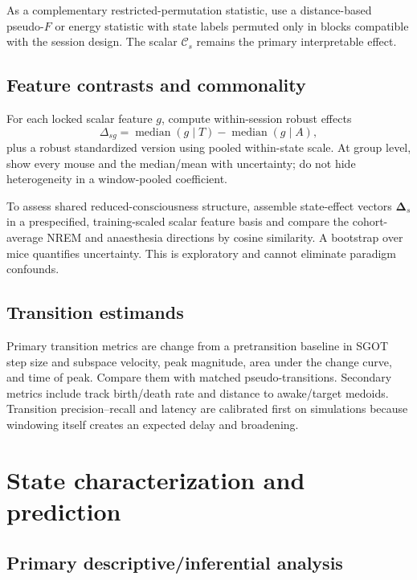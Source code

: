 \documentclass[11pt,a4paper]{article}
\begin{document}
As a complementary restricted-permutation statistic, use a distance-based pseudo-$F$ or energy statistic with state labels permuted only in blocks compatible with the session design. The scalar $\mathcal C_s$ remains the primary interpretable effect.

\subsection{Feature contrasts and commonality}

For each locked scalar feature $g$, compute within-session robust effects
\begin{equation}
  \Delta_{sg}=\operatorname{median}(g\mid T)-\operatorname{median}(g\mid A),
\end{equation}
plus a robust standardized version using pooled within-state scale. At group level, show every mouse and the median/mean with uncertainty; do not hide heterogeneity in a window-pooled coefficient.

To assess shared reduced-consciousness structure, assemble state-effect vectors $\boldsymbol\Delta_s$ in a prespecified, training-scaled scalar feature basis and compare the cohort-average NREM and anaesthesia directions by cosine similarity. A bootstrap over mice quantifies uncertainty. This is exploratory and cannot eliminate paradigm confounds.

\subsection{Transition estimands}

Primary transition metrics are change from a pretransition baseline in SGOT step size and subspace velocity, peak magnitude, area under the change curve, and time of peak. Compare them with matched pseudo-transitions. Secondary metrics include track birth/death rate and distance to awake/target medoids. Transition precision--recall and latency are calibrated first on simulations because windowing itself creates an expected delay and broadening.

\section{State characterization and prediction}

\subsection{Primary descriptive/inferential analysis}
\end{document}
